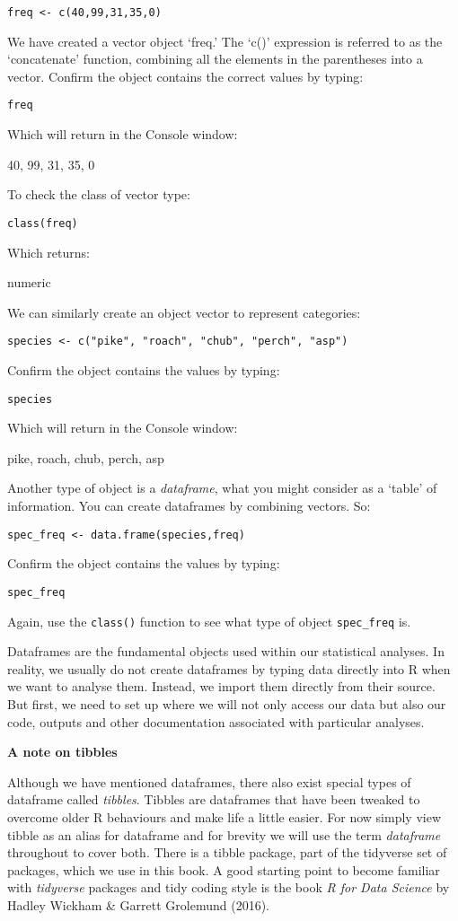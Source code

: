 \documentclass[
]{book}
\begin{document}
\texttt{freq\ \textless{}-\ c(40,99,31,35,0)}

We have created a vector object `freq.' The `c()' expression is referred
to as the `concatenate' function, combining all the elements in the
parentheses into a vector. Confirm the object contains the correct
values by typing:

\texttt{freq}

Which will return in the Console window:

40, 99, 31, 35, 0

To check the class of vector type:

\texttt{class(freq)}

Which returns:

numeric

We can similarly create an object vector to represent categories:

\texttt{species\ \textless{}-\ c("pike",\ "roach",\ "chub",\ "perch",\ "asp")}

Confirm the object contains the values by typing:

\texttt{species}

Which will return in the Console window:

pike, roach, chub, perch, asp

Another type of object is a \emph{dataframe}, what you might consider as
a `table' of information. You can create dataframes by combining
vectors. So:

\texttt{spec\_freq\ \textless{}-\ data.frame(species,freq)}

Confirm the object contains the values by typing:

\texttt{spec\_freq}

Again, use the \texttt{class()} function to see what type of object
\texttt{spec\_freq} is.

Dataframes are the fundamental objects used within our statistical
analyses. In reality, we usually do not create dataframes by typing data
directly into R when we want to analyse them. Instead, we import them
directly from their source. But first, we need to set up where we will
not only access our data but also our code, outputs and other
documentation associated with particular analyses.

\textbf{A note on tibbles}

Although we have mentioned dataframes, there also exist special types of
dataframe called \emph{tibbles}. Tibbles are dataframes that have been
tweaked to overcome older R behaviours and make life a little easier.
For now simply view tibble as an alias for dataframe and for brevity we
will use the term \emph{dataframe} throughout to cover both. There is a
tibble package, part of the tidyverse set of packages, which we use in
this book. A good starting point to become familiar with
\emph{tidyverse} packages and tidy coding style is the book \emph{R for
Data Science} by Hadley Wickham \& Garrett Grolemund (2016).
\end{document}
